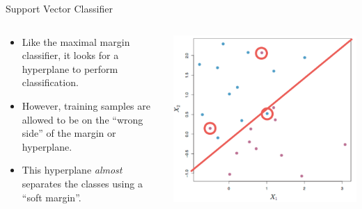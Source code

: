 \begin{frame}{Support Vector Classifier}
\begin{columns}
  \begin{column}{0.5\textwidth}
    \begin{itemize}
      \item Like the maximal margin classifier, it looks for a hyperplane to perform classification.
      \item However, training samples are allowed to be on the “wrong side” of the margin or hyperplane.
      \item This hyperplane \textit{almost} separates the classes using a “soft margin”.
    \end{itemize}
  \end{column}
  \begin{column}{0.5\textwidth}
    \includegraphics[width=\linewidth]{images/support-vector-machines/support-vector-machines-11.png}
  \end{column}
\end{columns}
\end{frame}



